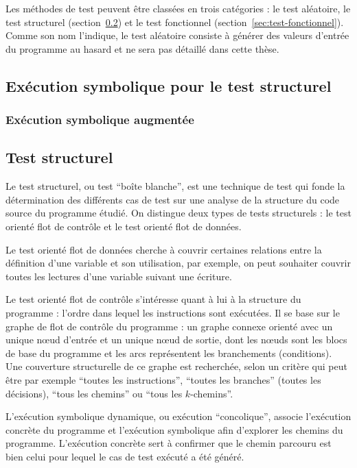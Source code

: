 Les méthodes de test peuvent être classées en trois catégories : le test
aléatoire, le test structurel (section~\ref{sec:test-structurel}) et le test
fonctionnel (section~\ref{sec:test-fonctionnel}). Comme son nom l'indique, le
test aléatoire consiste à générer des valeurs d'entrée du programme au hasard et
ne sera pas détaillé dans cette thèse.



\subsection{Exécution symbolique pour le test structurel}
\label{sec:exec-sym}



\subsubsection{Exécution symbolique augmentée}



\subsection{Test structurel}
\label{sec:test-structurel}

Le test structurel, ou test ``boîte blanche'', est une technique de test qui
fonde la détermination des différents cas de test sur une analyse de la
structure du code source du programme étudié. On distingue deux types de tests
structurels : le test orienté flot de contrôle et le test orienté flot de
données.

Le test orienté flot de données cherche à couvrir certaines relations entre la
définition d’une variable et son utilisation, par exemple, on peut souhaiter
couvrir toutes les lectures d'une variable suivant une écriture.

Le test orienté flot de contrôle s’intéresse quant à lui à la structure du
programme : l'ordre dans lequel les instructions sont exécutées. Il se base sur
le graphe de flot de contrôle du programme : un graphe connexe orienté avec un
unique n\oe{}ud d’entrée et un unique n\oe{}ud de sortie, dont les n\oe{}uds
sont les blocs de base du programme et les arcs représentent les branchements
(conditions). Une couverture structurelle de ce graphe est recherchée, selon un
critère qui peut être par exemple ``toutes les instructions'',
``toutes les branches'' (toutes les décisions), ``tous les chemins'' ou
``tous les $k$-chemins''.

L’exécution symbolique dynamique, ou exécution ``concolique'', associe
l’exécution concrète du programme et l’exécution symbolique afin d’explorer les
chemins du programme. L’exécution concrète sert à confirmer que le chemin
parcouru est bien celui pour lequel le cas de test exécuté a été généré.

